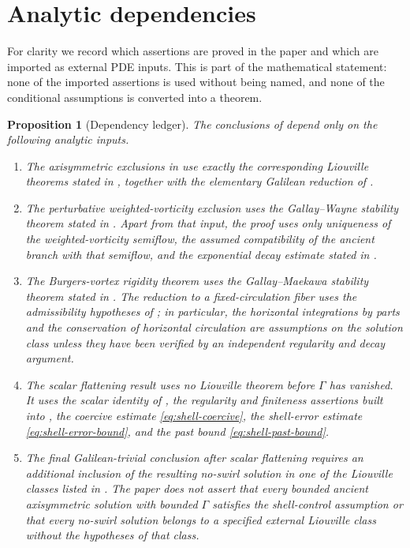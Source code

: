 \documentclass[11pt]{amsart}
\theoremstyle{plain}
\newtheorem{proposition}[theorem]{Proposition}
\theoremstyle{definition}
\theoremstyle{remark}
\numberwithin{equation}{section}
\begin{document}
\section{Analytic dependencies}

For clarity we record which assertions are proved in the paper and which are
imported as external PDE inputs.  This is part of the mathematical statement:
none of the imported assertions is used without being named, and none of the
conditional assumptions is converted into a theorem.

\begin{proposition}[Dependency ledger]\label{prop:dependency-ledger}
The conclusions of  depend only on the following analytic
inputs.
\begin{enumerate}[label=\textup{(\roman*)}]
\item The axisymmetric exclusions in 
use exactly the corresponding Liouville theorems stated in
,
together with the elementary Galilean reduction of
.
\item The perturbative weighted-vorticity exclusion uses the
Gallay--Wayne stability theorem stated in .  Apart from
that input, the proof uses only uniqueness of the weighted-vorticity semiflow,
the assumed compatibility of the ancient branch with that semiflow, and the
exponential decay estimate stated in .
\item The Burgers-vortex rigidity theorem uses the Gallay--Maekawa stability
theorem stated in .  The reduction to a fixed-circulation
fiber uses the admissibility hypotheses of ; in
particular, the horizontal integrations by parts and the conservation of
horizontal circulation are assumptions on the solution class unless they have
been verified by an independent regularity and decay argument.
\item The scalar flattening result uses no Liouville theorem before
\(\Gamma\) has vanished.  It uses the scalar identity of
, the regularity and finiteness assertions built into
, the coercive estimate
\eqref{eq:shell-coercive}, the shell-error estimate
\eqref{eq:shell-error-bound}, and the past bound
\eqref{eq:shell-past-bound}.
\item The final Galilean-trivial conclusion after scalar flattening requires
an additional inclusion of the resulting no-swirl solution in one of the
Liouville classes listed in .  The paper does not assert
that every bounded ancient axisymmetric solution with bounded \(\Gamma\)
satisfies the shell-control assumption or that every no-swirl solution belongs
to a specified external Liouville class without the hypotheses of that class.
\end{enumerate}
\end{proposition}
\end{document}
